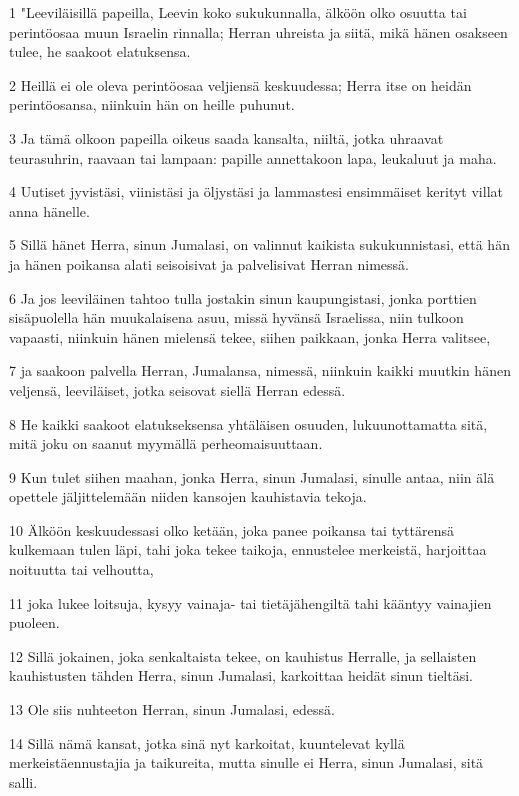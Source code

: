 \par 1 "Leeviläisillä papeilla, Leevin koko sukukunnalla, älköön olko osuutta tai perintöosaa muun Israelin rinnalla; Herran uhreista ja siitä, mikä hänen osakseen tulee, he saakoot elatuksensa.
\par 2 Heillä ei ole oleva perintöosaa veljiensä keskuudessa; Herra itse on heidän perintöosansa, niinkuin hän on heille puhunut.
\par 3 Ja tämä olkoon papeilla oikeus saada kansalta, niiltä, jotka uhraavat teurasuhrin, raavaan tai lampaan: papille annettakoon lapa, leukaluut ja maha.
\par 4 Uutiset jyvistäsi, viinistäsi ja öljystäsi ja lammastesi ensimmäiset kerityt villat anna hänelle.
\par 5 Sillä hänet Herra, sinun Jumalasi, on valinnut kaikista sukukunnistasi, että hän ja hänen poikansa alati seisoisivat ja palvelisivat Herran nimessä.
\par 6 Ja jos leeviläinen tahtoo tulla jostakin sinun kaupungistasi, jonka porttien sisäpuolella hän muukalaisena asuu, missä hyvänsä Israelissa, niin tulkoon vapaasti, niinkuin hänen mielensä tekee, siihen paikkaan, jonka Herra valitsee,
\par 7 ja saakoon palvella Herran, Jumalansa, nimessä, niinkuin kaikki muutkin hänen veljensä, leeviläiset, jotka seisovat siellä Herran edessä.
\par 8 He kaikki saakoot elatukseksensa yhtäläisen osuuden, lukuunottamatta sitä, mitä joku on saanut myymällä perheomaisuuttaan.
\par 9 Kun tulet siihen maahan, jonka Herra, sinun Jumalasi, sinulle antaa, niin älä opettele jäljittelemään niiden kansojen kauhistavia tekoja.
\par 10 Älköön keskuudessasi olko ketään, joka panee poikansa tai tyttärensä kulkemaan tulen läpi, tahi joka tekee taikoja, ennustelee merkeistä, harjoittaa noituutta tai velhoutta,
\par 11 joka lukee loitsuja, kysyy vainaja- tai tietäjähengiltä tahi kääntyy vainajien puoleen.
\par 12 Sillä jokainen, joka senkaltaista tekee, on kauhistus Herralle, ja sellaisten kauhistusten tähden Herra, sinun Jumalasi, karkoittaa heidät sinun tieltäsi.
\par 13 Ole siis nuhteeton Herran, sinun Jumalasi, edessä.
\par 14 Sillä nämä kansat, jotka sinä nyt karkoitat, kuuntelevat kyllä merkeistäennustajia ja taikureita, mutta sinulle ei Herra, sinun Jumalasi, sitä salli.
